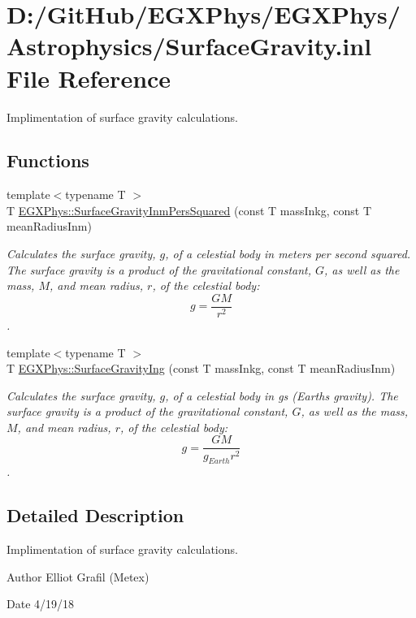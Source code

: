 \hypertarget{_surface_gravity_8inl}{}\section{D\+:/\+Git\+Hub/\+E\+G\+X\+Phys/\+E\+G\+X\+Phys/\+Astrophysics/\+Surface\+Gravity.inl File Reference}
\label{_surface_gravity_8inl}


Implimentation of surface gravity calculations.  


\subsection*{Functions}
\begin{DoxyCompactItemize}
\item 
{\footnotesize template$<$typename T $>$ }\\T \mbox{\hyperlink{group___e_g_x_phys-_astrophysics-_surface_gravity_gaf7e1f42b674fe8bb2211c40882a7d5b6}{E\+G\+X\+Phys\+::\+Surface\+Gravity\+Inm\+Pers\+Squared}} (const T mass\+Inkg, const T mean\+Radius\+Inm)
\begin{DoxyCompactList}\small\item\em Calculates the surface gravity, $g$, of a celestial body in meters per second squared. The surface gravity is a product of the gravitational constant, $G$, as well as the mass, $M$, and mean radius, $r$, of the celestial body\+: \[g = \frac{GM}{r^2}\]. \end{DoxyCompactList}\item 
{\footnotesize template$<$typename T $>$ }\\T \mbox{\hyperlink{group___e_g_x_phys-_astrophysics-_surface_gravity_gab5bb479758d72608ef6ada063f6c1a1b}{E\+G\+X\+Phys\+::\+Surface\+Gravity\+Ing}} (const T mass\+Inkg, const T mean\+Radius\+Inm)
\begin{DoxyCompactList}\small\item\em Calculates the surface gravity, $g$, of a celestial body in gs (Earth\textquotesingle{}s gravity). The surface gravity is a product of the gravitational constant, $G$, as well as the mass, $M$, and mean radius, $r$, of the celestial body\+: \[g = \frac{GM}{g_{Earth}r^2}\]. \end{DoxyCompactList}\end{DoxyCompactItemize}


\subsection{Detailed Description}
Implimentation of surface gravity calculations. 

\begin{DoxyAuthor}{Author}
Elliot Grafil (Metex) 
\end{DoxyAuthor}
\begin{DoxyDate}{Date}
4/19/18 
\end{DoxyDate}
